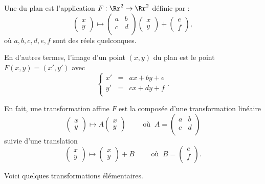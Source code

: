 \documentclass[11pt,class=report,crop=false]{standalone}
\begin{document}
Une  du plan est l'application $F : \Rr^2 \to \Rr^2$ définie par :
$$
\begin{pmatrix}x \\ y \end{pmatrix} \mapsto \begin{pmatrix}a & b \\ c & d \\  \end{pmatrix}
\begin{pmatrix}x \\ y \end{pmatrix} +\begin{pmatrix} e \\ f \end{pmatrix},$$
où $a,b,c,d, e, f$ sont des réels quelconques.

En d'autres termes, l'image d'un point $(x,y)$ du plan
est le point $F(x,y) = (x',y')$ avec
$$\left \{
\begin{array}{rcl}
	x' &=& ax + by + e \\
	y' &=& cx + dy + f \\
\end{array}
\right..$$

En fait, une transformation affine $F$ est la composée d'une transformation
linéaire 
$$
\begin{pmatrix}x \\ y \end{pmatrix} \mapsto A \begin{pmatrix}x \\ y \end{pmatrix} \qquad \text{ où } \  A =\begin{pmatrix}a & b \\ c & d \\  \end{pmatrix}$$
suivie d'une translation 
$$
\begin{pmatrix}x \\ y \end{pmatrix} \mapsto \begin{pmatrix}x \\ y \end{pmatrix} + B  \qquad \text{ où } \ B =\begin{pmatrix} e \\ f \\  \end{pmatrix}.$$




Voici quelques transformations élémentaires.
\end{document}
